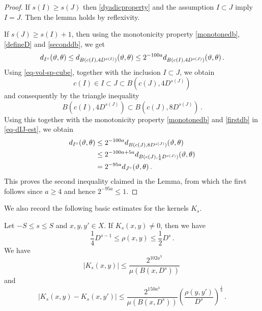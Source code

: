 \begin{proof}
    If $s(I) \ge s(J)$ then \eqref{dyadicproperty} and the assumption $I\subset J$ imply $I = J$. Then the lemma holds by reflexivity.

    If $s(J) \ge s(I)+1$, then using the monotonicity property \eqref{monotonedb}, \eqref{defineD} and \eqref{seconddb}, we get
    \begin{equation}
    \label{eq-dIJ-est}
        d_{I^\circ}({\vartheta}, {\theta}) \le d_{B(c(I), 4 D^{s(I)})}({\vartheta}, {\theta}) \le 2^{-100a} d_{B(c(I), 4D^{s(J)})}({\vartheta}, {\theta})\,.
    \end{equation}
    Using \eqref{eq-vol-sp-cube}, together with the inclusion $I \subset J$, we obtain
    $$
        c(I) \in I \subset J \subset B(c(J), 4 D^{s(J)})
    $$
    and consequently by the triangle inequality
    $$
        B(c(I), 4 D^{s(J)}) \subset B(c(J), 8 D^{s(J)})\,.
    $$
    Using this together with the monotonicity property \eqref{monotonedb} and \eqref{firstdb} in \eqref{eq-dIJ-est}, we obtain
    \begin{align*}
        d_{I^\circ}({\vartheta}, {\theta}) &\le 2^{-100a} d_{B(c(J), 8D^{s(J)})}({\vartheta}, {\theta})\\
        &\le 2^{-100a + 5a} d_{B(c(J), \frac{1}{4}D^{s(J)})}({\vartheta}, {\theta})\\
        &= 2^{-95a}d_{J^\circ}({\vartheta}, {\theta})\,.
    \end{align*}
    This proves the second inequality claimed in the Lemma, from which the first follows since $a \ge 4$ and hence $2^{-95a} \le 1$.
\end{proof}

We also record the following basic estimates for the kernels $K_s$.

\begin{lemma}
\label{kernel-summand}
    Let $-S\le s\le S$ and $x,y,y'\in X$.
    If $K_s(x,y)\neq 0$, then we have
    \begin{equation}\label{supp-Ks}
      \frac{1}{4} D^{s-1} \leq \rho(x,y) \leq \frac{1}{2} D^s\, .
    \end{equation}
    We have
    \begin{equation}
       \label{eq-Ks-size}
        |K_s(x,y)|\le \frac{2^{102 a^3}}{\mu(B(x, D^{s}))}\,
    \end{equation}
    and %
    \begin{equation}
        \label{eq-Ks-smooth}
        |K_s(x,y)-K_s(x, y')|\le \frac{2^{150a^3}}{\mu(B(x, D^{s}))}
        \left(\frac{ \rho(y,y')}{D^s}\right)^{\frac 1a}\,.
    \end{equation}
\end{lemma}

